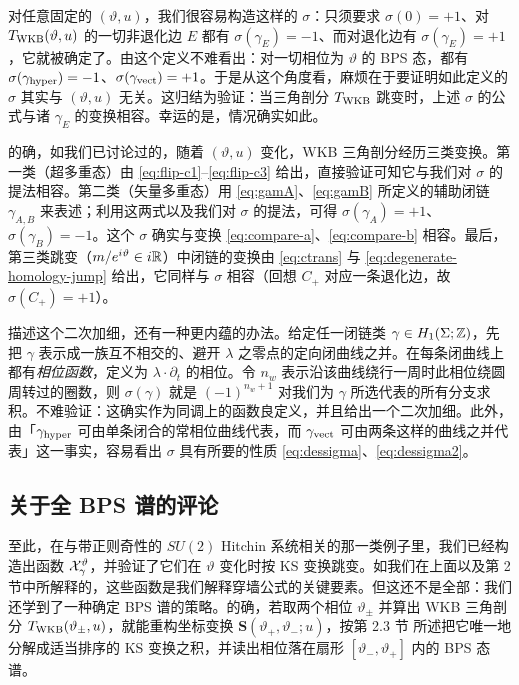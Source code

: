 对任意固定的 $(\vartheta,u)$，我们很容易构造这样的 $\sigma$：只须要求 $\sigma(0)=+1$、对 $T_{\rm WKB}(\vartheta,u)$ 的一切非退化边 $E$ 都有 $\sigma(\gamma_E)=-1$、而对退化边有 $\sigma(\gamma_E)=+1$，它就被确定了。由这个定义不难看出：对一切相位为 $\vartheta$ 的 BPS 态，都有 $\sigma(\gamma_{\rm hyper})=-1$、$\sigma(\gamma_{\rm vect})=+1$。于是从这个角度看，麻烦在于要证明如此定义的 $\sigma$ 其实与 $(\vartheta,u)$ 无关。这归结为验证：当三角剖分 $T_{\rm WKB}$ 跳变时，上述 $\sigma$ 的公式与诸 $\gamma_E$ 的变换相容。幸运的是，情况确实如此。

的确，如我们已讨论过的，随着 $(\vartheta,u)$ 变化，WKB 三角剖分经历三类变换。第一类（超多重态）由 \eqref{eq:flip-c1}–\eqref{eq:flip-c3} 给出，直接验证可知它与我们对 $\sigma$ 的提法相容。第二类（矢量多重态）用 \eqref{eq:gamA}、\eqref{eq:gamB} 所定义的辅助闭链 $\gamma_{A,B}$ 来表述；利用这两式以及我们对 $\sigma$ 的提法，可得 $\sigma(\gamma_A)=+1$、$\sigma(\gamma_B)=-1$。这个 $\sigma$ 确实与变换 \eqref{eq:compare-a}、\eqref{eq:compare-b} 相容。最后，第三类跳变（$m/e^{i\vartheta}\in i\mathbb{R}$）中闭链的变换由 \eqref{eq:ctrans} 与 \eqref{eq:degenerate-homology-jump} 给出，它同样与 $\sigma$ 相容（回想 $C_+$ 对应一条退化边，故 $\sigma(C_+)=+1$）。

描述这个二次加细，还有一种更内蕴的办法。给定任一闭链类 $\gamma\in H_1(\Sigma;\mathbb{Z})$，先把 $\gamma$ 表示成一族互不相交的、避开 $\lambda$ 之零点的定向闭曲线之并。在每条闭曲线上都有\emph{相位函数}，定义为 $\lambda\cdot\partial_t$ 的相位。令 $n_w$ 表示沿该曲线绕行一周时此相位绕圆周转过的圈数，则 $\sigma(\gamma)$ 就是 $(-1)^{n_w+1}$ 对我们为 $\gamma$ 所选代表的所有分支求积。不难验证：这确实作为同调上的函数良定义，并且给出一个二次加细。此外，由「$\gamma_{\rm hyper}$ 可由单条闭合的常相位曲线代表，而 $\gamma_{\rm vect}$ 可由两条这样的曲线之并代表」这一事实，容易看出 $\sigma$ 具有所要的性质 \eqref{eq:dessigma}、\eqref{eq:dessigma2}。

\subsection{关于全 BPS 谱的评论} \label{sec:bps-comments}

至此，在与带正则奇性的 $SU(2)$ Hitchin 系统相关的那一类例子里，我们已经构造出函数 $\mathcal{X}^\vartheta_\gamma$，并验证了它们在 $\vartheta$ 变化时按 KS 变换跳变。如我们在上面以及第 2 节中所解释的，这些函数是我们解释穿墙公式的关键要素。但这还不是全部：我们还学到了一种确定 BPS 谱的策略。的确，若取两个相位 $\vartheta_\pm$ 并算出 WKB 三角剖分 $T_{\rm WKB}(\vartheta_\pm,u)$，就能重构坐标变换 $\mathbf{S}(\vartheta_+,\vartheta_-;u)$，按第 2.3 节%
所述把它唯一地分解成适当排序的 KS 变换之积，并读出相位落在扇形 $[\vartheta_-,\vartheta_+]$ 内的 BPS 态谱。

